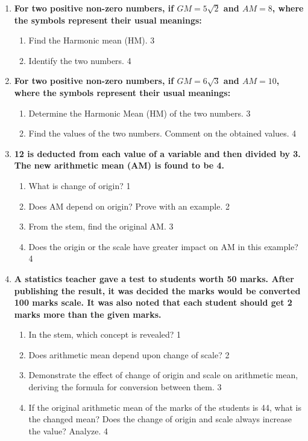 \documentclass[a4paper,oneside]{book}
\begin{document}
\begin{enumerate}
  \item
\textbf{For two positive non-zero numbers, if $GM = 5\sqrt{2}$ and $AM = 8$, where the symbols represent their usual meanings:}

\begin{enumerate}
    \item  
    Find the Harmonic mean (HM). \hfill 3
    \item
    Identify the two numbers. \hfill 4
\end{enumerate}

\item
\textbf{For two positive non-zero numbers, if $GM = 6\sqrt{3}$ and $AM = 10$, where the symbols represent their usual meanings:}

\begin{enumerate}
    \item  
    Determine the Harmonic Mean (HM) of the two numbers. \hfill 3
    \item
    Find the values of the two numbers. Comment on the obtained values. \hfill 4
\end{enumerate}

  
   \item
	  \textbf{12 is deducted from each value of a variable and then divided by 3. The new arithmetic mean (AM) is found to be 4.} 
  
  \begin{enumerate}
    \item
	What is change of origin? \hfill 1
    \item
	Does AM depend on origin? Prove with an example. \hfill 2
    \item  
	From the stem, find the original AM. \hfill 3
    \item
	Does the origin or the scale have greater impact on AM in this example? \hfill 4
  \end{enumerate}
  
   \item
	  \textbf{A statistics teacher gave a test to students worth 50 marks. After publishing the result, it was decided the marks would be converted 100 marks scale. It was also noted that each student should get 2 marks more than the given marks.} 
  
  \begin{enumerate}
    \item
	In the stem, which concept is revealed? \hfill 1
    \item
	Does arithmetic mean depend upon change of scale? \hfill 2
    \item  
	Demonstrate the effect of change of origin and scale on arithmetic mean, deriving the formula for conversion between them. \hfill 3
    \item 
    If the original arithmetic mean of the marks of the students is 44, what is the changed mean? Does the change of origin and scale always increase the value? Analyze.
	 \hfill 4
  \end{enumerate}


\end{enumerate}
\end{document}
